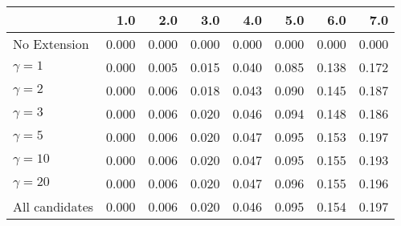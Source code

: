 \begin{tabular}{lrrrrrrr}
\toprule
{} &   1.0 &   2.0 &   3.0 &   4.0 &   5.0 &   6.0 &   7.0 \\
\midrule
No Extension   & 0.000 & 0.000 & 0.000 & 0.000 & 0.000 & 0.000 & 0.000 \\
$\gamma = 1$   & 0.000 & 0.005 & 0.015 & 0.040 & 0.085 & 0.138 & 0.172 \\
$\gamma = 2$   & 0.000 & 0.006 & 0.018 & 0.043 & 0.090 & 0.145 & 0.187 \\
$\gamma = 3$   & 0.000 & 0.006 & 0.020 & 0.046 & 0.094 & 0.148 & 0.186 \\
$\gamma = 5$   & 0.000 & 0.006 & 0.020 & 0.047 & 0.095 & 0.153 & 0.197 \\
$\gamma = 10$  & 0.000 & 0.006 & 0.020 & 0.047 & 0.095 & 0.155 & 0.193 \\
$\gamma = 20$  & 0.000 & 0.006 & 0.020 & 0.047 & 0.096 & 0.155 & 0.196 \\
All candidates & 0.000 & 0.006 & 0.020 & 0.046 & 0.095 & 0.154 & 0.197 \\
\bottomrule
\end{tabular}
